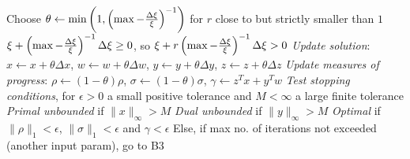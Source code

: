 Choose $\theta\leftarrow\min\left(1,\left(\max-{\Delta\xi\over\xi}
\right)^{-1}\right)$ for $r$ close to but strictly smaller than $1$\smallskip
{}$\xi+\left(\max-{\Delta\xi\over\xi}\right)^{-1}\Delta\xi
\geq 0$, so $\xi+r\left(\max-{\Delta\xi\over\xi}\right)^{-1}\Delta\xi>0$
\smallskip
{}\emph{Update solution}: $x\leftarrow x+\theta\Delta x$,
$w\leftarrow w+\theta\Delta w$, $y\leftarrow y+\theta\Delta y$, $z\leftarrow z+
\theta\Delta z$\smallskip
{}\emph{Update measures of progress}: $\rho\leftarrow(1-\theta)\rho$,
$\sigma\leftarrow(1-\theta)\sigma$, $\gamma\leftarrow z^Tx+y^Tw$\smallskip
{}\emph{Test stopping conditions}, for $\epsilon>0$ a small positive
tolerance and $M<\infty$ a large finite tolerance\smallskip
{}\emph{Primal unbounded} if $\|x\|_{\infty}>M$\smallskip
{}\emph{Dual unbounded} if $\|y\|_{\infty}>M$\smallskip
{}\emph{Optimal} if $\|\rho\|_1<\epsilon$, $\|\sigma\|_1<\epsilon$ and
$\gamma<\epsilon$\smallskip
{}Else, if max no. of iterations not exceeded (another input param),
go to B3\smallskip

\vfill\eject

